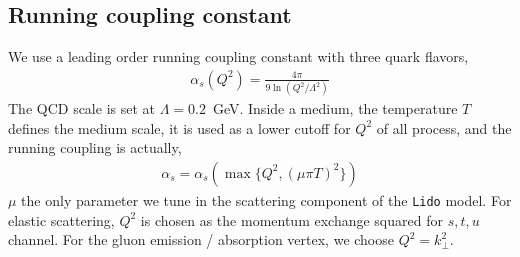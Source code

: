\documentclass[aps, prc, reprint, amsmath, groupedaddress, nofootinbib]{revtex4-1}
\begin{document}
\begin{appendices}
\section{Running coupling constant}
\label{appendix:alphas}
We use a leading order running coupling constant with three  quark flavors,
\begin{eqnarray}
\alpha_s(Q^2) = \frac{4\pi}{9 \ln\left(Q^2/\Lambda^2\right) }
\end{eqnarray}
The QCD scale is set at $\Lambda = 0.2$~GeV.
Inside a medium, the temperature $T$ defines the medium scale, it is used as a lower cutoff for $Q^2$ of all process, and the running coupling is actually,
\begin{eqnarray}
\alpha_s = \alpha_s(\max\{Q^2,(\mu\pi T)^2\})
\end{eqnarray}
$\mu$ the only parameter we tune in the scattering component of the {\tt Lido} model.
For elastic scattering, $Q^2$ is chosen as the momentum exchange squared for $s,t,u$ channel.
For the gluon emission / absorption vertex, we choose $Q^2 = k_\perp^2$.

\end{appendices}
\end{document}
